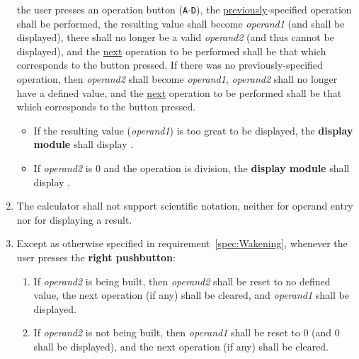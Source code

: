 \begin{enumerate}
    the user presses an operation button (\texttt{A}-\texttt{D}), the
    \underline{previously}-specified operation shall be performed, the
    resulting value shall become \textit{operand1} (and shall be displayed),
    there shall no longer be a valid \textit{operand2} (and thus cannot be displayed), and the \underline{next} operation
    to be performed shall be that which corresponds to the button pressed. If
    there was no previously-specified operation, then \textit{operand2} shall
    become \textit{operand1}, \textit{operand2} shall no longer have a defined
    value, and the \underline{next} operation to be performed shall be that
    which corresponds to the button pressed.
    \begin{itemize}
    \item If the resulting value (\textit{operand1}) is too great to be
        displayed, the \textbf{display module} shall display
        .
    \item If \textit{operand2} is 0 and the operation is division, the
        \textbf{display module} shall display .
    \end{itemize}
\item The calculator shall not support scientific notation, neither for operand
    entry nor for displaying a result.
\item Except as otherwise specified in requirement~\ref{spec:Wakening},
    whenever the user presses the \textbf{right pushbutton}:
    \begin{enumerate}
    \item If \textit{operand2} is being built, then \textit{operand2} shall be
        reset to no defined value, the next operation (if any) shall be
        cleared, and \textit{operand1} shall be displayed.
    \item If \textit{operand2} is not being built, then \textit{operand1} shall
        be reset to 0 (and 0 shall be displayed), and the next operation (if
        any) shall be cleared.
    \end{enumerate}


\end{enumerate}

